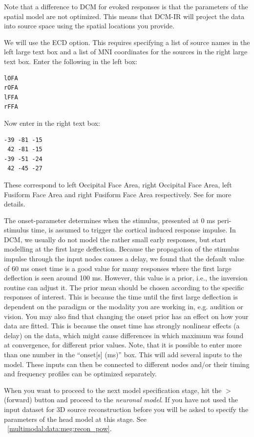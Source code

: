 Note that a difference to DCM for evoked responses is that the parameters of the spatial model are not optimized. This means that DCM-IR will project the data into source space using the spatial locations you provide.

We will use the ECD option. This requires specifying a list of source names in the left large text box and a list of MNI coordinates for the sources in the right large text box. Enter the following in the left box:

\begin{verbatim}
lOFA
rOFA
lFFA
rFFA
\end{verbatim}

Now enter in the right text box:

\begin{verbatim}
-39 -81 -15
 42 -81 -15
-39 -51 -24
 42 -45 -27
\end{verbatim}

These correspond to left Occipital Face Area, right Occipital Face Area, left Fusiform Face Area and right Fusiform Face Area respectively. See \cite{cc_induced} for more details.

The onset-parameter determines when the stimulus, presented at 0 ms peri-stimulus time, is assumed to trigger the cortical induced response impulse. In DCM, we usually do not model the rather small early responses, but start modelling at the first large deflection. Because the propagation of the stimulus impulse through the input nodes causes a delay, we found that the default value of 60
ms onset time is a good value for many responses where the first large deflection is seen around 100 ms. However, this value is a
prior, i.e., the inversion routine can adjust it. The prior mean should be chosen according to the specific responses of interest. This is because the time until the first large deflection is dependent on the paradigm or the modality you are working in, e.g. audition or vision. You may also find that changing the onset prior has an effect on how your data are
fitted. This is because the onset time has strongly nonlinear effects (a delay) on the data, which might cause differences in which maximum was found at convergence, for different prior values. Note, that it is possible to enter more than one number in the ``onset[s] (ms)'' box. This will add several inputs to the model. These inputs can then be connected to different nodes and/or their timing and frequency profiles can be optimized separately.

When you want to proceed to the next model specification stage, hit the $>$ (forward) button and proceed to the \textit{neuronal model}. If you have not used the input dataset for 3D source reconstruction before you will be asked to specify the parameters of the head model at this stage. See ~\ref{multimodal:data:meg:recon_pow}.

